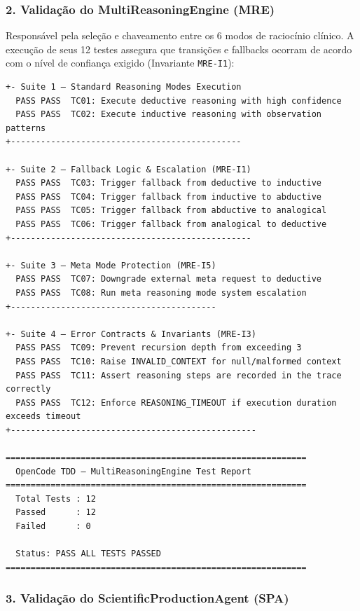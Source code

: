 \subsubsection*{2. Validação do MultiReasoningEngine (MRE)}

Responsável pela seleção e chaveamento entre os 6 modos de raciocínio clínico. A execução de seus 12 testes assegura que transições e fallbacks ocorram de acordo com o nível de confiança exigido (Invariante \texttt{MRE-I1}):

\begin{lstlisting}[style=bashstyle, caption={Saída do Executor de Testes do OpenCode MultiReasoningEngine}, label={lst:tdd_mre_output}]
+- Suite 1 — Standard Reasoning Modes Execution
  PASS PASS  TC01: Execute deductive reasoning with high confidence
  PASS PASS  TC02: Execute inductive reasoning with observation patterns
+----------------------------------------------

+- Suite 2 — Fallback Logic & Escalation (MRE-I1)
  PASS PASS  TC03: Trigger fallback from deductive to inductive
  PASS PASS  TC04: Trigger fallback from inductive to abductive
  PASS PASS  TC05: Trigger fallback from abductive to analogical
  PASS PASS  TC06: Trigger fallback from analogical to deductive
+------------------------------------------------

+- Suite 3 — Meta Mode Protection (MRE-I5)
  PASS PASS  TC07: Downgrade external meta request to deductive
  PASS PASS  TC08: Run meta reasoning mode system escalation
+-----------------------------------------

+- Suite 4 — Error Contracts & Invariants (MRE-I3)
  PASS PASS  TC09: Prevent recursion depth from exceeding 3
  PASS PASS  TC10: Raise INVALID_CONTEXT for null/malformed context
  PASS PASS  TC11: Assert reasoning steps are recorded in the trace correctly
  PASS PASS  TC12: Enforce REASONING_TIMEOUT if execution duration exceeds timeout
+-------------------------------------------------

============================================================
  OpenCode TDD — MultiReasoningEngine Test Report
============================================================
  Total Tests : 12
  Passed      : 12
  Failed      : 0

  Status: PASS ALL TESTS PASSED
============================================================
\end{lstlisting}

\subsubsection*{3. Validação do ScientificProductionAgent (SPA)}

